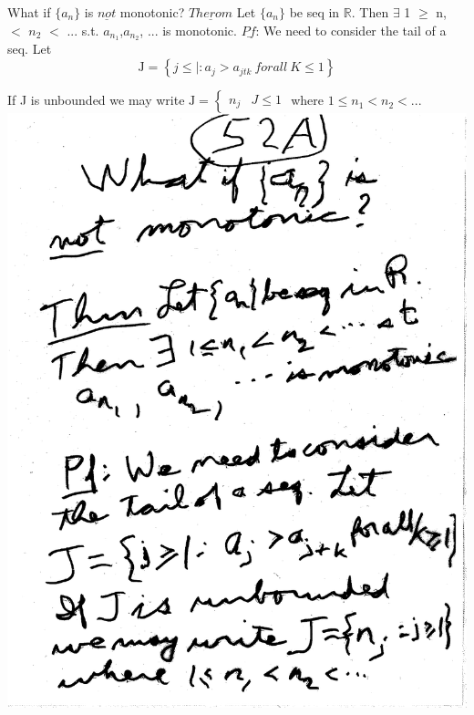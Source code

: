 \documentclass[10pt,a4paper]{article}
\begin{document}
\newpage
What if $\{ a_n \}$ is $\underline{not}$ monotonic?
$\underline{Therom}$ Let $\{ a_n \}$ be seq in $\mathbb{R}$.
Then $\exists$ 1 $\geq$ n, $<$ $n_2$ $<$ ... s.t. $a_{n_{1}}$,$a_{n_{2}}$, ... is monotonic.
$\underline{Pf}$: We need to consider the tail of a seq. Let 
$$\mbox{J} = \left\{ j \leq | : a_j > a_{j{t{k}}}\ for all\ K \leq 1 \right\}$$

If J is  unbounded we may write $\mbox{J} = \begin{cases} n_j & J\leq 1 \end{cases}$ where $1 \leq n_1 <n_2<...$
\includegraphics[scale=.5]{Pages/LC_7}
\end{document}
